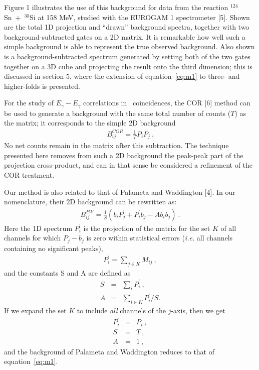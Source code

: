 Figure 1 illustrates the use of this background for data from the reaction
$^{124}$Sn~+~$^{30}$Si at 158 MeV, studied with the EUROGAM 1 spectrometer [5].
Shown are the total 1D projection and ``drawn'' background spectra, together
with two background-subtracted gates on a 2D matrix.
It is remarkable how well such a simple background is able to represent the
true observed background.
Also shown is a background-subtracted spectrum generated by setting both of the
two gates together on a 3D cube and projecting the result onto the third
dimension; this is discussed in section 5, where the extension of
equation~\ref{eq:m1} to three- and higher-folds is presented.

For the study of $E_{\gamma} - E_{\gamma}$ correlations in \ghg\ coincidences,
the COR [6] method can be used to generate a background with the same total
number of counts ($T$) as the matrix; it corresponds to the simple 2D
background
\begin{eqnarray*}
B_{ij}^{COR} = \frac {1}{T} P_i P_j \ .
\end{eqnarray*} 
No net counts remain in the matrix after this subtraction. The technique
presented here removes from such a 2D background the peak-peak part of the
projection cross-product, and can in that sense be considered a refinement of
the COR treatment.

Our method is also related to that of Palameta and Waddington [4].
In our nomenclature, their 2D background can be rewritten as:
\begin{eqnarray*}
B_{ij}^{PW} = \frac {1}{S} (b_i P^{\prime}_j + P^{\prime}_i b_j
                               - A b_i b_j) \ .
\end{eqnarray*}
Here the 1D spectrum $P^{\prime}_i$ is the projection of the matrix for the
set $K$ of all channels for which $P_j - b_j$ is zero within statistical
errors ({\em i.e.} all channels containing no significant peaks),
\begin{eqnarray*}
P^{\prime}_i = \sum_{j \in K} M_{ij} \ ,
\end{eqnarray*}
and the constants S and A are defined as
\begin{eqnarray*}
S & = & \sum_i P^{\prime}_i \ , \\
A & = & \sum_{i \in K} P^{\prime}_i / S.
\end{eqnarray*}
If we expand the set $K$ to include {\em all} channels of the $j$-axis, then we
get
\begin{eqnarray*}
P^{\prime}_i & = & P_i \ , \\
             S & = & T \ , \\
             A & = & 1 \ ,
\end{eqnarray*}
and the background of Palameta and Waddington reduces to that of
equation~\ref{eq:m1}.


